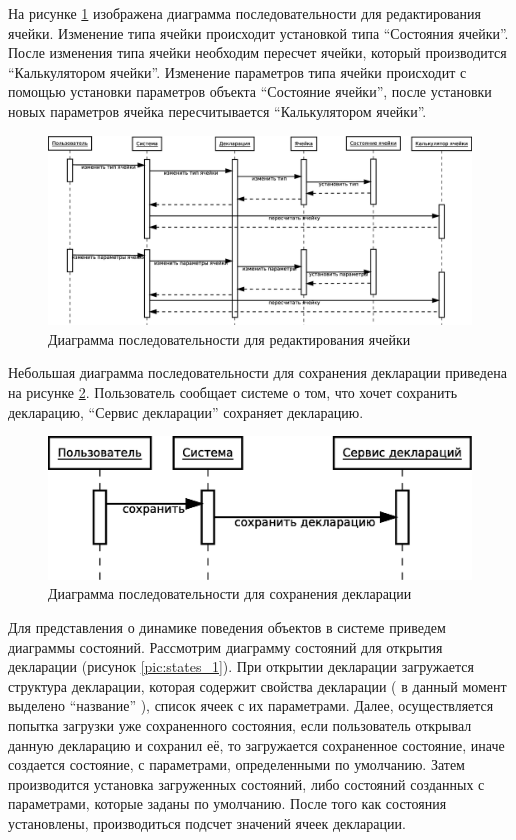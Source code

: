 \documentclass[14pt,a4paper]{reportmod}
\begin{document}
На рисунке \ref{pic:sequence_4} изображена диаграмма последовательности для редактирования ячейки. Изменение типа ячейки происходит установкой типа ``Состояния ячейки''. После изменения типа ячейки необходим пересчет ячейки, который производится ``Калькулятором ячейки''. Изменение параметров типа ячейки происходит с помощью установки параметров объекта ``Состояние ячейки'', после установки новых параметров ячейка пересчитывается ``Калькулятором ячейки''.

\begin{figure}
  \centering
  \includegraphics[scale=0.4]{uml/_sequence_2}
  \caption{Диаграмма последовательности для редактирования ячейки}
  \label{pic:sequence_4}
\end{figure}

Небольшая диаграмма последовательности для сохранения декларации приведена на рисунке \ref{pic:sequence_5}. Пользователь сообщает системе о том, что хочет сохранить декларацию, ``Сервис декларации'' сохраняет декларацию.

\begin{figure}
  \centering
  \includegraphics[scale=0.4]{uml/_sequence_3}
  \caption{Диаграмма последовательности для сохранения декларации}
  \label{pic:sequence_5}
\end{figure}

Для представления о динамике поведения объектов в системе приведем диаграммы состояний. Рассмотрим диаграмму состояний для открытия декларации (рисунок \ref{pic:states_1}). При открытии декларации загружается структура декларации, которая содержит свойства декларации ( в данный момент выделено ``название'' ), список ячеек с их параметрами. Далее, осуществляется попытка загрузки уже сохраненного состояния, если пользователь открывал данную декларацию и сохранил её, то загружается сохраненное состояние, иначе создается состояние, с параметрами, определенными по умолчанию. Затем производится установка загруженных состояний, либо состояний созданных с параметрами, которые заданы по умолчанию. После того как состояния установлены, производиться подсчет значений ячеек декларации.
\end{document}
